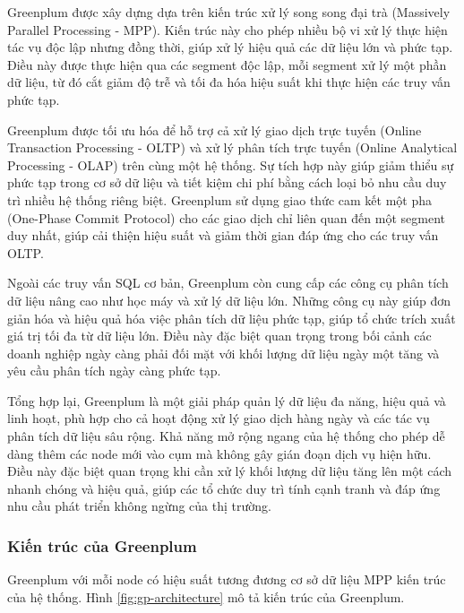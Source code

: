 \documentclass[14pt]{article}
\begin{document}
Greenplum được xây dựng dựa trên kiến trúc xử lý song song đại trà (Massively Parallel Processing - MPP). Kiến trúc này cho phép nhiều bộ vi xử lý thực hiện tác vụ độc lập nhưng đồng thời, giúp xử lý hiệu quả các dữ liệu lớn và phức tạp. Điều này được thực hiện qua các segment độc lập, mỗi segment xử lý một phần dữ liệu, từ đó cắt giảm độ trễ và tối đa hóa hiệu suất khi thực hiện các truy vấn phức tạp.

Greenplum được tối ưu hóa để hỗ trợ cả xử lý giao dịch trực tuyến (Online Transaction Processing - OLTP) và xử lý phân tích trực tuyến (Online Analytical Processing - OLAP) trên cùng một hệ thống. Sự tích hợp này giúp giảm thiểu sự phức tạp trong cơ sở dữ liệu và tiết kiệm chi phí bằng cách loại bỏ nhu cầu duy trì nhiều hệ thống riêng biệt. Greenplum sử dụng giao thức cam kết một pha (One-Phase Commit Protocol) cho các giao dịch chỉ liên quan đến một segment duy nhất, giúp cải thiện hiệu suất và giảm thời gian đáp ứng cho các truy vấn OLTP.

Ngoài các truy vấn SQL cơ bản, Greenplum còn cung cấp các công cụ phân tích dữ liệu nâng cao như học máy và xử lý dữ liệu lớn. Những công cụ này giúp đơn giản hóa và hiệu quả hóa việc phân tích dữ liệu phức tạp, giúp tổ chức trích xuất giá trị tối đa từ dữ liệu lớn. Điều này đặc biệt quan trọng trong bối cảnh các doanh nghiệp ngày càng phải đối mặt với khối lượng dữ liệu ngày một tăng và yêu cầu phân tích ngày càng phức tạp.

Tổng hợp lại, Greenplum là một giải pháp quản lý dữ liệu đa năng, hiệu quả và linh hoạt, phù hợp cho cả hoạt động xử lý giao dịch hàng ngày và các tác vụ phân tích dữ liệu sâu rộng. Khả năng mở rộng ngang của hệ thống cho phép dễ dàng thêm các node mới vào cụm mà không gây gián đoạn dịch vụ hiện hữu. Điều này đặc biệt quan trọng khi cần xử lý khối lượng dữ liệu tăng lên một cách nhanh chóng và hiệu quả, giúp các tổ chức duy trì tính cạnh tranh và đáp ứng nhu cầu phát triển không ngừng của thị trường.

\subsubsection{Kiến trúc của Greenplum}

Greenplum với mỗi node có hiệu suất tương đương cơ sở dữ liệu MPP kiến trúc của hệ thống. Hình \ref{fig:gp-architecture} mô tả kiến trúc của Greenplum.
\end{document}
